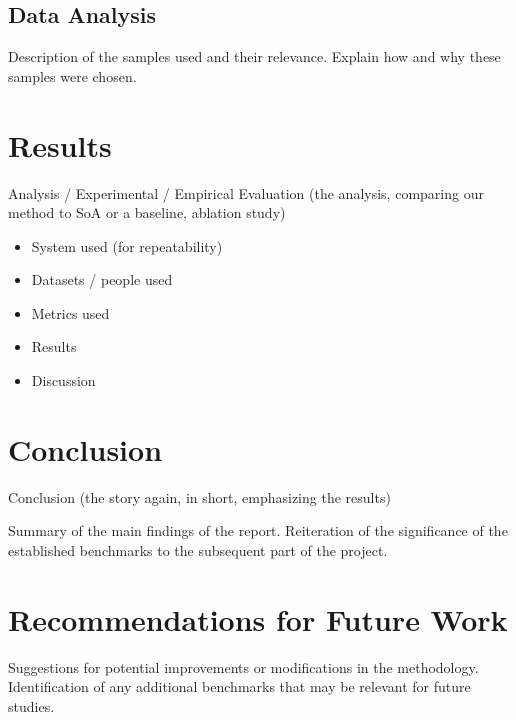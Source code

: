 \subsection{Data Analysis}
Description of the samples used and their relevance.
Explain how and why these samples were chosen.

\section{Results}
Analysis / Experimental / Empirical Evaluation (the analysis, comparing our method to SoA or a baseline, ablation study)
\begin{itemize}
    \item System used (for repeatability)
    \item Datasets / people used
    \item Metrics used
    \item Results
    \item Discussion
\end{itemize}

\section{Conclusion}
Conclusion (the story again, in short, emphasizing the results)

Summary of the main findings of the report.
Reiteration of the significance of the established benchmarks to the subsequent part of the project.

\section{Recommendations for Future Work}
Suggestions for potential improvements or modifications in the methodology.
Identification of any additional benchmarks that may be relevant for future studies.
